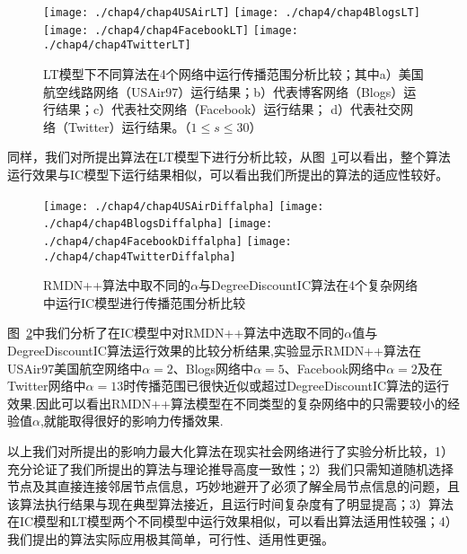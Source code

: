 \begin{figure}[H]
	\centering%
	\subcaptionbox{\label{fig:chap4USAirLT}}
	{\texttt{[image: ./chap4/chap4USAirLT]}}
	\subcaptionbox{\label{fig:chap4BlogsLT}}
	{\texttt{[image: ./chap4/chap4BlogsLT]}}
	\subcaptionbox{\label{fig:chap4FacebookLT}}
	{\texttt{[image: ./chap4/chap4FacebookLT]}}
	\subcaptionbox{\label{fig:chap4TwitterLT}}
	{\texttt{[image: ./chap4/chap4TwitterLT]}}
	\caption{LT模型下不同算法在4个网络中运行传播范围分析比较；其中a）美国航空线路网络（USAir97）运行结果；b）代表博客网络（Blogs）运行结果；c）代表社交网络（Facebook）运行结果； d）代表社交网络（Twitter）运行结果。（$1\le s\leq 30$）}
	\label{fig:chap4IMLT}
\end{figure}
同样，我们对所提出算法在LT模型下进行分析比较，从图~\ref{fig:chap4IMLT}可以看出，整个算法运行效果与IC模型下运行结果相似，可以看出我们所提出的算法的适应性较好。


\begin{figure}[H]
	\centering%
	\subcaptionbox{\label{fig:chap4USAirDiffalpha}}
	{\texttt{[image: ./chap4/chap4USAirDiffalpha]}}
	\subcaptionbox{\label{fig:chap4BlogsDiffalpha}}
	{\texttt{[image: ./chap4/chap4BlogsDiffalpha]}}
	\subcaptionbox{\label{fig:chap4FacebookDiffalpha}}
	{\texttt{[image: ./chap4/chap4FacebookDiffalpha]}}
	\subcaptionbox{\label{fig:chap4TwitterDiffalpha}}
	{\texttt{[image: ./chap4/chap4TwitterDiffalpha]}}
	\caption{RMDN++算法中取不同的$\alpha$与DegreeDiscountIC算法在4个复杂网络中运行IC模型进行传播范围分析比较}
	\label{fig:chap4IMDiffalpha}
\end{figure}
图~\ref{fig:chap4IMDiffalpha}中我们分析了在IC模型中对RMDN++算法中选取不同的$\alpha$值与DegreeDiscountIC算法运行效果的比较分析结果,实验显示RMDN++算法在USAir97美国航空网络中$\alpha =2$、Blogs网络中$\alpha =5$、Facebook网络中$\alpha =2$及在Twitter网络中$\alpha =13$时传播范围已很快近似或超过DegreeDiscountIC算法的运行效果.因此可以看出RMDN++算法模型在不同类型的复杂网络中的只需要较小的经验值$\alpha$,就能取得很好的影响力传播效果.

以上我们对所提出的影响力最大化算法在现实社会网络进行了实验分析比较，1）充分论证了我们所提出的算法与理论推导高度一致性；2）我们只需知道随机选择节点及其直接连接邻居节点信息，巧妙地避开了必须了解全局节点信息的问题，且该算法执行结果与现在典型算法接近，且运行时间复杂度有了明显提高；3）算法在IC模型和LT模型两个不同模型中运行效果相似，可以看出算法适用性较强；4）我们提出的算法实际应用极其简单，可行性、适用性更强。


